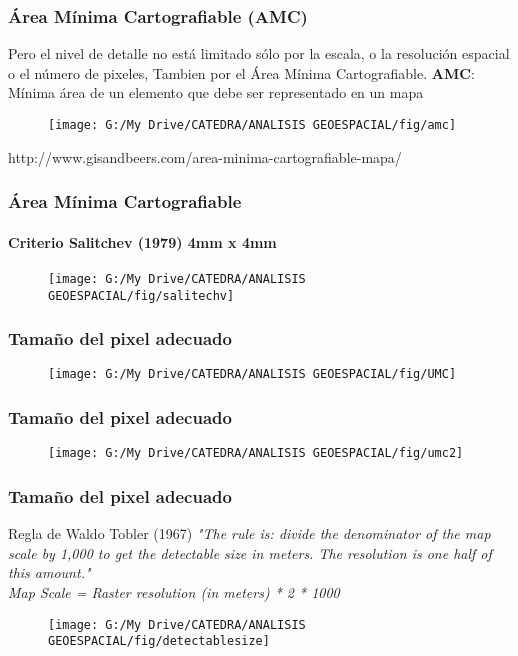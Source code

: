 \documentclass[14pt]{beamer}
\begin{document}
\begin{frame}
\frametitle{Área Mínima Cartografiable (AMC)}
\scriptsize{Pero el nivel de detalle no está limitado sólo por la escala, o la resolución espacial o el número de pixeles, Tambien por el Área Mínima Cartografiable.}\vfill
\small{\textbf{AMC}: Mínima área de un elemento que debe ser representado en un mapa}
 \begin{figure}
    \centering
    \texttt{[image: G:/My Drive/CATEDRA/ANALISIS GEOESPACIAL/fig/amc]}
  \end{figure}
\tiny{http://www.gisandbeers.com/area-minima-cartografiable-mapa/}
\end{frame}
\begin{frame}
\frametitle{Área Mínima Cartografiable}
\framesubtitle{Criterio Salitchev (1979) 4mm x 4mm}
 \begin{figure}
    \centering
    \texttt{[image: G:/My Drive/CATEDRA/ANALISIS GEOESPACIAL/fig/salitechv]}
  \end{figure}
\end{frame}
\begin{frame}
\frametitle{Tamaño del pixel adecuado}
 \begin{figure}
    \centering
    \texttt{[image: G:/My Drive/CATEDRA/ANALISIS GEOESPACIAL/fig/UMC]}
  \end{figure}
\end{frame}
\begin{frame}
\frametitle{Tamaño del pixel adecuado}
 \begin{figure}
    \centering
    \texttt{[image: G:/My Drive/CATEDRA/ANALISIS GEOESPACIAL/fig/umc2]}
  \end{figure}
\end{frame}
\begin{frame}
\frametitle{Tamaño del pixel adecuado}
\begin{exampleblock}{Regla de Waldo Tobler (1967) }
\small{\emph{"The rule is: divide the denominator of the map scale by 1,000 to get the detectable size in meters. The resolution is one half of this amount."\\
Map Scale = Raster resolution (in meters) * 2 * 1000}}
\end{exampleblock}
 \begin{figure}
    \centering
    \texttt{[image: G:/My Drive/CATEDRA/ANALISIS GEOESPACIAL/fig/detectablesize]}
  \end{figure}
\end{frame}
\end{document}

